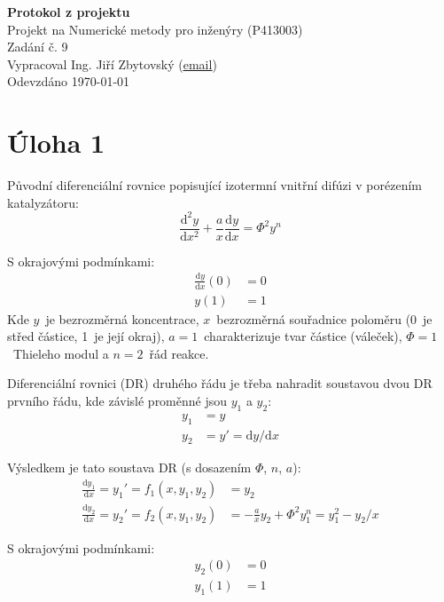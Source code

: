 \documentclass[a4paper,12pt]{article}
\begin{document}
\def\D{\mathrm{d}} %

\begin{center}
\LARGE\textbf{Protokol z projektu} \\
\vspace{2cm}
\large{
	Projekt na Numerické metody pro inženýry (P413003) \\
	Zadání č. 9 \\
	Vypracoval Ing. Jiří Zbytovský (\textcolor{blue}{\underline{\href{mailto:zbytovsi@vscht.cz}{email}}}) \\
	Odevzdáno \today
}
\end{center}



\newpage
\section*{Úloha 1}
Původní diferenciální rovnice popisující izotermní vnitřní difúzi v porézením katalyzátoru:
\begin{equation}
	\frac{\D^2 y}{\D x^2} + \frac{a}{x} \frac{\D y}{\D x} = \Phi^2 y^n
\end{equation}

S okrajovými podmínkami:
\begin{align}
	\frac{\D y}{\D x} (0) &= 0
	\\
	y(1) &= 1
\end{align}
Kde $y$~je bezrozměrná koncentrace, $x$~bezrozměrná souřadnice poloměru (0~je střed částice, 1~je její okraj), $a=1$~charakterizuje tvar částice (váleček), $\Phi=1$~Thieleho modul a $n=2$~řád reakce.

Diferenciální rovnici (DR) druhého řádu je třeba nahradit soustavou dvou DR prvního řádu, kde závislé proměnné jsou $y_1$ a $y_2$:
\begin{align}
	y_1 &= y
	\\
	y_2 &= y' = \D y / \D x
\end{align}

Výsledkem je tato soustava DR (s dosazením $\Phi$, $n$, $a$):
\begin{align}
	\frac{\D y_1}{\D x} = y_1' = f_1(x,y_1,y_2) &= y_2
	\\
	\frac{\D y_2}{\D x} = y_2' = f_2(x,y_1,y_2) &= -\frac{a}{x} y_2 + \Phi^2 y_1^n = y_1^2 - y_2 / x
\end{align}

S okrajovými podmínkami:
\begin{align}
	y_2(0) &= 0
	\\
	y_1(1) &= 1
\end{align}
\end{document}

